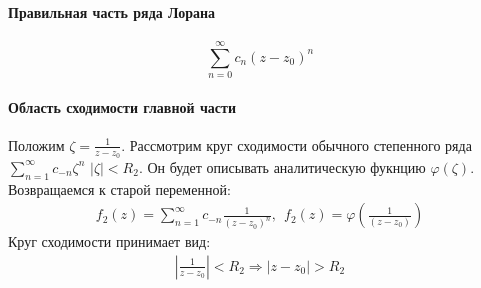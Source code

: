 \documentclass[12pt]{extarticle}
\begin{document}
\paragraph{Правильная часть ряда Лорана}
\begin{displaymath}
    \sum\limits_{n=0}^{\infty}c_{n}(z-z_{0})^{n}
\end{displaymath}

\paragraph{Область сходимости главной части}
Положим $\zeta=\frac{1}{z-z_{0}}$. Рассмотрим круг сходимости обычного
степенного ряда $\sum\limits_{n=1}^{\infty}c_{-n}\zeta^{n}$
$|\zeta|<R_{2}$. Он будет описывать аналитическую фукнцию
$\varphi(\zeta)$. Возвращаемся к старой переменной:
\begin{eqnarray*}
    f_{2}(z)=\sum\limits_{n=1}^{\infty}c_{-n}\frac{1}{(z-z_{0})^{n}}
    ,\ \ f_{2}(z)=\varphi\left(\frac{1}{(z-z_{0})}\right)
\end{eqnarray*}
Круг сходимости принимает вид:
\begin{eqnarray*}
    \left|\frac{1}{z-z_{0}}\right|<R_{2}
    \Rightarrow |z-z_{0}|>R_{2}
\end{eqnarray*}
\end{document}
